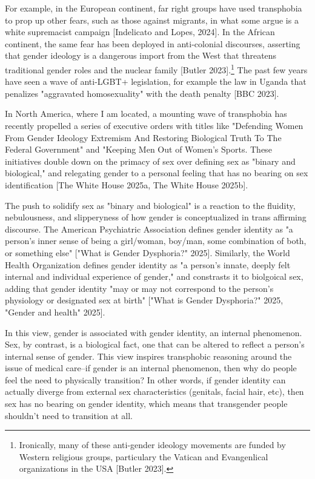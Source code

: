 \documentclass[11pt]{article}
\begin{document}
For example, in the European continent, far right groups have used
transphobia to prop up other fears, such as those against migrants, in
what some argue is a white supremacist campaign [Indelicato and Lopes,
2024]. In the African continent, the same fear has been deployed in
anti-colonial discourses, asserting that gender ideology is a
dangerous import from the West that threatens traditional gender roles
and the nuclear family [Butler 2023].\footnote{Ironically, many of these anti-gender ideology movements are
funded by Western religious groups, particulary the Vatican and
Evangenlical organizations in the USA [Butler 2023].} The past few years have
seen a wave of anti-LGBT+ legislation, for example the law in Uganda
that penalizes "aggravated homosexuality" with the death penalty [BBC
2023].

In North America, where I am located, a mounting wave of transphobia
has recently propelled a series of executive orders with titles like
"Defending Women From Gender Ideology Extremism And Restoring
Biological Truth To The Federal Government" and "Keeping Men Out of
Women's Sports. These initiatives double down on the primacy of sex
over defining sex as "binary and biological," and relegating gender to
a personal feeling that has no bearing on sex identification [The
White House 2025a, The White House 2025b].

The push to solidify sex as "binary and biological" is a reaction to
the fluidity, nebulousness, and slipperyness of how gender is
conceptualized in trans affirming discourse. The American Psychiatric
Association defines gender identity as "a person’s inner sense of
being a girl/woman, boy/man, some combination of both, or something
else" ["What is Gender Dysphoria?" 2025]. Similarly, the World Health
Organization defines gender identity as "a person’s innate, deeply
felt internal and individual experience of gender," and constrasts it
to biolgoical sex, adding that gender identity "may or may not
correspond to the person’s physiology or designated sex at birth"
["What is Gender Dysphoria?" 2025, "Gender and health" 2025].

In this view, gender is associated with gender identity, an internal
phenomenon. Sex, by contrast, is a biological fact, one that can be
altered to reflect a person's internal sense of gender. This view
inspires transphobic reasoning around the issue of medical care--if
gender is an internal phenomenon, then why do people feel the need to
physically transition? In other words, if gender identity can actually
diverge from external sex characteristics (genitals, facial hair,
etc), then sex has no bearing on gender identity, which means that
transgender people shouldn't need to transition at all.
\end{document}

